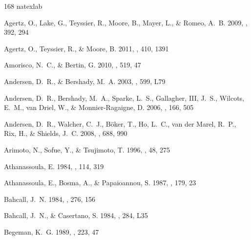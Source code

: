 \documentclass[apj,iop,numberedappendix]{emulateapj}
\begin{document}
\begin{thebibliography}{168}
\expandafter\ifx\csname natexlab\endcsname\relax\def\natexlab#1{#1}\fi

{Agertz}, O., {Lake}, G., {Teyssier}, R., {Moore}, B., {Mayer}, L., \& {Romeo},
  A.~B. 2009, \mnras, 392, 294

{Agertz}, O., {Teyssier}, R., \& {Moore}, B. 2011, \mnras, 410, 1391

{Amorisco}, N.~C., \& {Bertin}, G. 2010, \aap, 519, 47

{Andersen}, D.~R., \& {Bershady}, M.~A. 2003, \apjl, 599, L79

{Andersen}, D.~R., {Bershady}, M.~A., {Sparke}, L.~S., {Gallagher}, III, J.~S.,
  {Wilcots}, E.~M., {van Driel}, W., \& {Monnier-Ragaigne}, D. 2006, \apjs,
  166, 505

{Andersen}, D.~R., {Walcher}, C.~J., {B{\"o}ker}, T., {Ho}, L.~C., {van der
  Marel}, R.~P., {Rix}, H., \& {Shields}, J.~C. 2008, \apj, 688, 990

{Arimoto}, N., {Sofue}, Y., \& {Tsujimoto}, T. 1996, \pasj, 48, 275

{Athanassoula}, E. 1984, \physrep, 114, 319

{Athanassoula}, E., {Bosma}, A., \& {Papaioannou}, S. 1987, \aap, 179, 23

{Bahcall}, J.~N. 1984, \apj, 276, 156

{Bahcall}, J.~N., \& {Casertano}, S. 1984, \apjl, 284, L35

{Begeman}, K.~G. 1989, \aap, 223, 47


\end{thebibliography}
\end{document}
